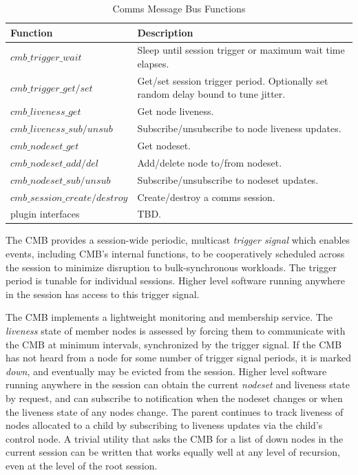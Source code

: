 \begin{table}
  \centering
  \begin{tabular}{| l | p{} |}\hline
  \textbf{Function} & \textbf{Description} \\
  \hline
  $cmb\_trigger\_wait $ &
	Sleep until session trigger or maximum wait time elapses. \\
  $cmb\_trigger\_get/set$ &
	Get/set session trigger period.
	Optionally set random delay bound to tune jitter.\\
  \hline
  $cmb\_liveness\_get$ &
	Get node liveness. \\
  $cmb\_liveness\_sub/unsub$ &
	Subscribe/unsubscribe to node liveness updates. \\
  \hline
  $cmb\_nodeset\_get$ &
	Get nodeset. \\
  $cmb\_nodeset\_add/del$ &
	Add/delete node to/from nodeset. \\
  $cmb\_nodeset\_sub/unsub$ &
	Subscribe/unsubscribe to nodeset updates. \\
  \hline
  $cmb\_session\_create/destroy$ &
	Create/destroy a comms session. \\
  \hline
  plugin interfaces &
	TBD. \\
  \hline
  \end{tabular}
  \caption{Comms Message Bus Functions}
  \label{TabCMBFun}
\end{table}
%

The CMB provides a session-wide periodic, multicast {\em trigger signal}
which enables events, including CMB's internal functions, to be cooperatively
scheduled across the session to minimize disruption to bulk-synchronous
workloads.  The trigger period is tunable for individual sessions.
Higher level software running anywhere in the session has access to
this trigger signal.

The CMB implements a lightweight monitoring and membership service.
The {\em liveness} state of member nodes is assessed by forcing
them to communicate with the CMB at minimum intervals,
synchronized by the trigger signal.
If the CMB has not heard from a node for some number
of trigger signal periods, it is marked {\em down}, and eventually may
be evicted from the session.  Higher level software running anywhere in
the session can obtain the current {\em nodeset} and liveness state
by request, and can subscribe to notification when the nodeset changes
or when the liveness state of any nodes change.
The parent continues to track liveness of nodes allocated to a child by
subscribing to liveness updates via the child's control node.  A trivial
utility that asks the CMB for a list of down nodes in the current session
can be written that works equally well at any level of recursion,
even at the level of the root session.

